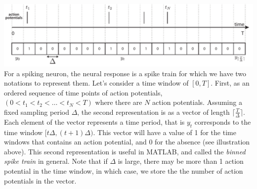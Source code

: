 \documentclass[letterpaper,11pt]{exam}
\DeclareMathOperator*{\E}{\mathbb{E}} %
\begin{document}
\begin{questions}

\newpage

\includegraphics[width=\textwidth]{binned_spike_train}
For a spiking neuron, the neural response is a spike train for which we have two notations to represent them.
Let's consider a time window of $[0, T]$.
First, as an ordered sequence of time points of action potentials, $(0 < t_1 < t_2 < \ldots < t_N < T)$ where there are $N$ action potentials.
Assuming a fixed sampling period $\Delta$, the second representation is as a vector of length $\lceil\frac{T}{\Delta}\rceil$.
Each element of the vector represents a time period, that is $y_t$ corresponds to the time window $[t\Delta, (t+1)\Delta)$.
This vector will have a value of 1 for the time windows that contains an action potential, and 0 for the absence (see illustration above).
This second representation is useful in MATLAB, and called the \emph{binned spike train} in general.
Note that if $\Delta$ is large, there may be more than 1 action potential in the time window, in which case, we store the the number of action potentials in the vector.


\end{questions}
\end{document}

